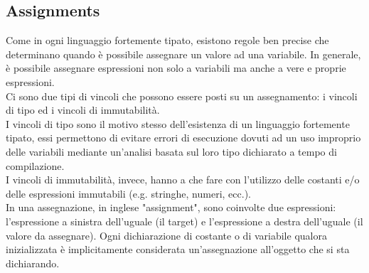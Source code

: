 \subsection{Assignments}
Come in ogni linguaggio fortemente tipato, esistono regole ben precise che determinano
quando è possibile assegnare un valore ad una variabile. In generale, è possibile assegnare 
espressioni non solo a variabili ma anche a vere e proprie espressioni. \\

Ci sono due tipi di vincoli
che possono essere posti su un assegnamento: i vincoli di tipo ed i vincoli di immutabilità. \\

I vincoli di tipo sono il motivo stesso dell'esistenza di un linguaggio fortemente tipato,
essi permettono di evitare errori di esecuzione dovuti ad un uso improprio delle variabili
mediante un'analisi basata sul loro tipo dichiarato a tempo di compilazione. \\

I vincoli di immutabilità, invece, hanno a che fare con l'utilizzo delle costanti e/o
delle espressioni immutabili (e.g. stringhe, numeri, ecc.). \\

In una assegnazione, in inglese "assignment", sono coinvolte due espressioni: l'espressione a sinistra
dell'uguale (il target) e l'espressione a destra dell'uguale (il valore da assegnare). Ogni dichiarazione
di costante o di variabile qualora inizializzata è implicitamente considerata un'assegnazione
all'oggetto che si sta dichiarando.








